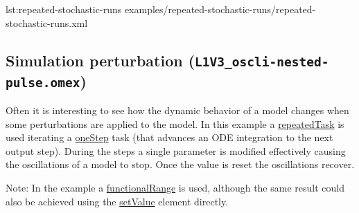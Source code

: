 {lst:repeated-stochastic-runs}
{examples/repeated-stochastic-runs/repeated-stochastic-runs.xml}


\subsection{Simulation perturbation (\texttt{L1V3\_oscli-nested-pulse.omex})}
Often it is interesting to see how the dynamic behavior of a model changes when some perturbations are applied to the model. In this example a \hyperref[class:repeatedTask]{repeatedTask} is used iterating a \hyperref[class:oneStep]{oneStep} task (that advances an ODE integration to the next output step). During the steps a single parameter is modified effectively causing the oscillations of a model to stop. Once the value is reset the oscillations recover. 

Note: In the example a \hyperref[class:functionalRange]{functionalRange} is used, although the same result could also be achieved using the \hyperref[class:setValue]{setValue} element directly.

